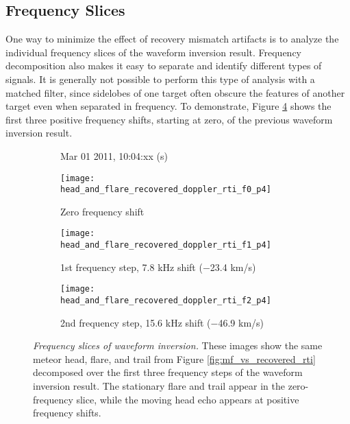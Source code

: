 \subsection{Frequency Slices}
One way to minimize the effect of recovery mismatch artifacts is to analyze the individual frequency slices of the waveform inversion result. Frequency decomposition also makes it easy to separate and identify different types of signals. It is generally not possible to perform this type of analysis with a matched filter, since sidelobes of one target often obscure the features of another target even when separated in frequency. To demonstrate, Figure \ref{fig:recovered_dopplerslices} shows the first three positive frequency shifts, starting at zero, of the previous waveform inversion result.
\begin{figure}[tpb]
 \vspace{-1.5\baselineskip}
 \begin{subfigure}{\textwidth}
  \centering
  \textsf{\footnotesize Mar 01 2011, 10:04:xx (s)}
  
  \texttt{[image: head\_and\_flare\_recovered\_doppler\_rti\_f0\_p4]}
  \caption{Zero frequency shift}
  \label{fig:recovered_dopplerslices_f0}
 \end{subfigure}
 
 \vspace{0.5\baselineskip}
 \begin{subfigure}{\textwidth}
  \centering
  \texttt{[image: head\_and\_flare\_recovered\_doppler\_rti\_f1\_p4]}
  \caption{1st frequency step, 7.8 kHz shift ($-$23.4 km/s)}
  \label{fig:recovered_dopplerslices_f1}
 \end{subfigure}
 
 \vspace{0.5\baselineskip}
 \begin{subfigure}{\textwidth}
  \centering
  \texttt{[image: head\_and\_flare\_recovered\_doppler\_rti\_f2\_p4]}
  \caption{2nd frequency step, 15.6 kHz shift ($-$46.9 km/s)}
  \label{fig:recovered_dopplerslices_f2}
 \end{subfigure}
 \caption[Frequency slices of waveform inversion]{\emph{Frequency slices of waveform inversion.} These images show the same meteor head, flare, and trail from Figure \ref{fig:mf_vs_recovered_rti} decomposed over the first three frequency steps of the waveform inversion result. The stationary flare and trail appear in the zero-frequency slice, while the moving head echo appears at positive frequency shifts.}
 \label{fig:recovered_dopplerslices}
\end{figure}%

